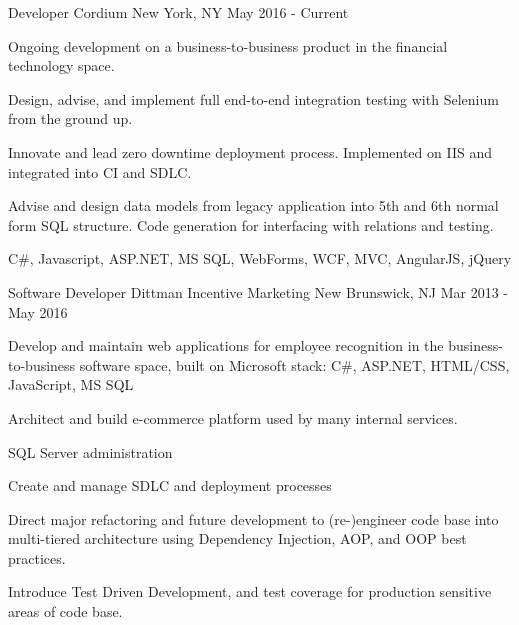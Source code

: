 \documentclass[11pt, letterpaper]{awesome-cv}
\begin{document}


\begin{cventries}
 \cventry
   {Developer}
   {Cordium}
   {New York, NY}
   {May 2016 - Current}
   {
     \begin {cvitems}
       \item {Ongoing development on a business-to-business product in the financial technology space.}
       \item {Design, advise, and implement full end-to-end integration testing with Selenium from the ground up.}
       \item {Innovate and lead zero downtime deployment process. Implemented on IIS and integrated into CI and SDLC.}
       \item {Advise and design data models from legacy application into 5th and 6th normal form SQL structure.  Code generation for interfacing with relations and testing.}
       \item {C\#, Javascript, ASP.NET, MS SQL, WebForms, WCF, MVC, AngularJS, jQuery}
     \end {cvitems}
   }
  \vspace{1mm}
  \cventry
    {Software Developer} %
    {Dittman Incentive Marketing} %
    {New Brunswick, NJ} %
    {Mar 2013 - May 2016} 
    {
      \begin{cvitems} 
        \item {Develop and maintain web applications for employee recognition in the business-to-business software space, built on Microsoft stack: C\#, ASP.NET, HTML/CSS, JavaScript, MS SQL}
        \item {Architect and build e-commerce platform used by many internal services.}
        \item {SQL Server administration}
        \item {Create and manage SDLC and deployment processes}
        \item {Direct major refactoring and future development to (re-)engineer code base into multi-tiered architecture using Dependency Injection, AOP, and OOP best practices.}
	\item {Introduce Test Driven Development, and test coverage for production sensitive areas of code base.}

\end{cvitems}}
\end{cventries}
\end{document}
